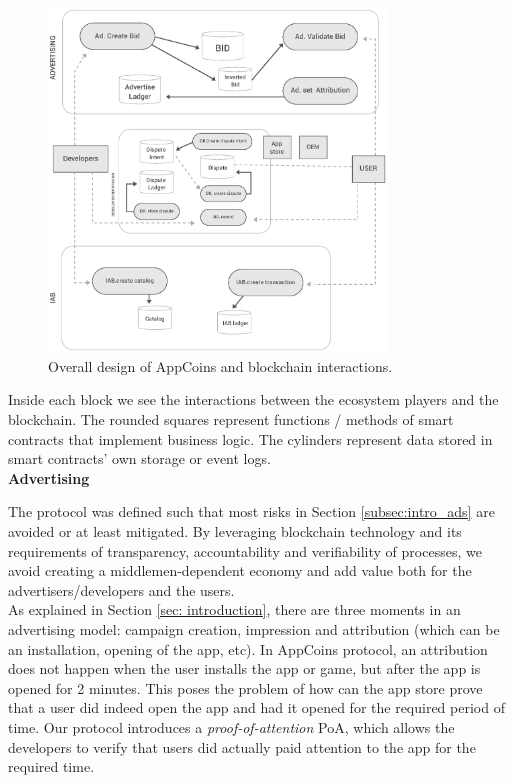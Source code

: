 \begin{figure}[!ht]
\centering
\includegraphics[width=0.8\textwidth]{diagrams/design.eps}
\caption{Overall design of AppCoins and blockchain interactions.}
\label{fig:design}
\end{figure}

Inside each block we see the interactions between the ecosystem players and the blockchain. The 
rounded squares represent functions / methods of smart contracts that implement business logic. The 
cylinders represent data stored in smart contracts' own storage or event logs. \\

{\bf Advertising}

The protocol was defined such that most risks in Section \ref{subsec:intro_ads} are avoided or at least mitigated. By leveraging blockchain technology and its requirements of transparency, accountability and verifiability of processes, we avoid creating a middlemen-dependent economy and add value both for the advertisers/developers and the users. \\

As explained in Section \ref{sec: introduction}, there are three moments in an advertising model: campaign creation, impression and attribution (which can be an installation, opening of the app, etc).  In AppCoins protocol, an attribution does not happen when the user installs the app or game, but after the app is opened for 2 minutes. This poses the problem of how can the app store prove that a user did indeed open the app and had it opened for the required period of time. Our protocol introduces a \textit{proof-of-attention} \textsf{PoA}, which allows the developers to verify that users did actually paid attention to the app for the required time. \\

